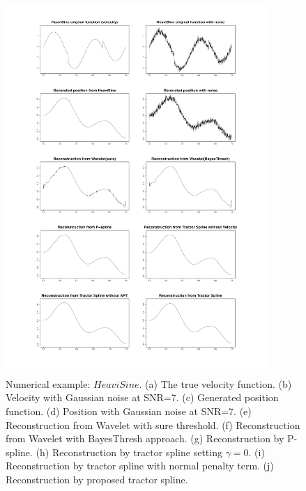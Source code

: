 \begin{figure}
  \centering
    \includegraphics[width=\textwidth,height=14cm]{Chapters/2.TractorSplineTheory/plot/heavi10} 
  \caption{Numerical example: $\textit{HeaviSine}$. (a) The true velocity function. (b) Velocity with Gaussian noise at SNR=7. (c) Generated position function. (d) Position with Gaussian noise at SNR=7. (e) Reconstruction from Wavelet with sure threshold. (f) Reconstruction from Wavelet with BayesThresh approach. (g) Reconstruction by P-spline. (h) Reconstruction by tractor spline setting $\gamma=0$. (i) Reconstruction by tractor spline with normal penalty term. (j) Reconstruction by proposed tractor spline.}\label{num3}
\end{figure}

